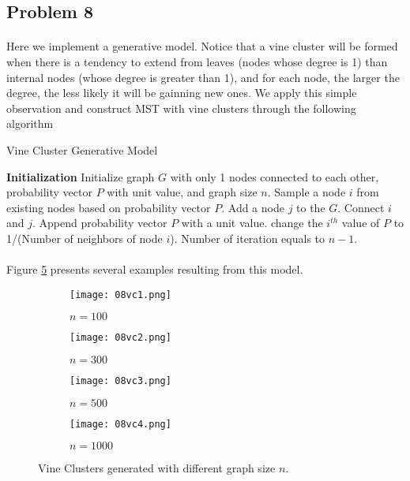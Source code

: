 \subsection*{Problem 8}
\paragraph{}
Here we implement a generative model. Notice that a vine cluster will be formed when there is a tendency to extend from leaves (nodes whose degree is 1) than internal nodes (whose degree is greater than 1), and for each node, the larger the degree, the less likely it will be gainning new ones. We apply this simple observation and construct MST with vine clusters through the following algorithm

\begin{algorithm}[H]
	\caption{Vine Cluster Generative Model}
	\begin{algorithmic}[1]		
		\Statex \textbf{Initialization} Initialize graph $G$ with only 1 nodes connected to each other, probability vector $P$ with unit value, and graph size $n$.
		\Repeat
		\State Sample a node $i$ from existing nodes based on probability vector $P$.
		\State Add a node $j$ to the $G$.
		\State Connect $i$ and $j$.
		\State Append probability vector $P$ with a unit value.
		\State change the $i^{th}$ value of $P$ to 1/(Number of neighbors of node $i$).
		\Until Number of iteration equals to $n-1$.
	\end{algorithmic}
\end{algorithm}
\paragraph{}
Figure \ref{fig:08vc} presents several examples resulting from this model.

\begin{figure}[h]
	\centering
	\begin{subfigure}{.5\textwidth}
		\centering
		\texttt{[image: 08vc1.png]}
		\caption{$n = 100$}	
		\label{fig:08vc1} 
	\end{subfigure}%
	\begin{subfigure}{.5\textwidth}
		\centering
		\texttt{[image: 08vc2.png]}
		\caption{$n = 300$}
		\label{fig:08vc2} 
	\end{subfigure}
	\begin{subfigure}{.5\textwidth}
		\centering
		\texttt{[image: 08vc3.png]}
		\caption{$n = 500$}	
		\label{fig:08vc3} 
	\end{subfigure}%
	\begin{subfigure}{.5\textwidth}
		\centering
		\texttt{[image: 08vc4.png]}
		\caption{$n = 1000$}
		\label{fig:08vc4} 
	\end{subfigure}
	\caption{Vine Clusters generated with different graph size $n$.}
	\label{fig:08vc}
\end{figure}